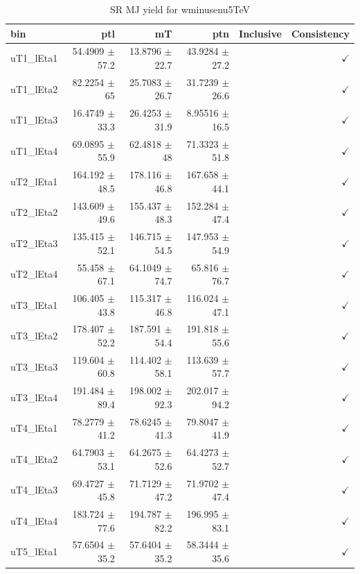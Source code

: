\begin{table}[htbp]
\centering
\scriptsize
\caption{SR MJ yield for wminusenu5TeV}
\label{tab:wminusenu5TeV}
\setlength{\tabcolsep}{6pt}
\begin{tabular}{lrrrrr}
\hline
bin & ptl & mT & ptn & Inclusive & Consistency \\
\hline
uT1\_lEta1 & 54.4909 $\pm$ 57.2 & 13.8796 $\pm$ 22.7 & 43.9284 $\pm$ 27.2 &  & $\checkmark$ \\
uT1\_lEta2 & 82.2254 $\pm$ 65 & 25.7083 $\pm$ 26.7 & 31.7239 $\pm$ 26.6 &  & $\checkmark$ \\
uT1\_lEta3 & 16.4749 $\pm$ 33.3 & 26.4253 $\pm$ 31.9 & 8.95516 $\pm$ 16.5 &  & $\checkmark$ \\
uT1\_lEta4 & 69.0895 $\pm$ 55.9 & 62.4818 $\pm$ 48 & 71.3323 $\pm$ 51.8 &  & $\checkmark$ \\
uT2\_lEta1 & 164.192 $\pm$ 48.5 & 178.116 $\pm$ 46.8 & 167.658 $\pm$ 44.1 &  & $\checkmark$ \\
uT2\_lEta2 & 143.609 $\pm$ 49.6 & 155.437 $\pm$ 48.3 & 152.284 $\pm$ 47.4 &  & $\checkmark$ \\
uT2\_lEta3 & 135.415 $\pm$ 52.1 & 146.715 $\pm$ 54.5 & 147.953 $\pm$ 54.9 &  & $\checkmark$ \\
uT2\_lEta4 & 55.458 $\pm$ 67.1 & 64.1049 $\pm$ 74.7 & 65.816 $\pm$ 76.7 &  & $\checkmark$ \\
uT3\_lEta1 & 106.405 $\pm$ 43.8 & 115.317 $\pm$ 46.8 & 116.024 $\pm$ 47.1 &  & $\checkmark$ \\
uT3\_lEta2 & 178.407 $\pm$ 52.2 & 187.591 $\pm$ 54.4 & 191.818 $\pm$ 55.6 &  & $\checkmark$ \\
uT3\_lEta3 & 119.604 $\pm$ 60.8 & 114.402 $\pm$ 58.1 & 113.639 $\pm$ 57.7 &  & $\checkmark$ \\
uT3\_lEta4 & 191.484 $\pm$ 89.4 & 198.002 $\pm$ 92.3 & 202.017 $\pm$ 94.2 &  & $\checkmark$ \\
uT4\_lEta1 & 78.2779 $\pm$ 41.2 & 78.6245 $\pm$ 41.3 & 79.8047 $\pm$ 41.9 &  & $\checkmark$ \\
uT4\_lEta2 & 64.7903 $\pm$ 53.1 & 64.2675 $\pm$ 52.6 & 64.4273 $\pm$ 52.7 &  & $\checkmark$ \\
uT4\_lEta3 & 69.4727 $\pm$ 45.8 & 71.7129 $\pm$ 47.2 & 71.9702 $\pm$ 47.4 &  & $\checkmark$ \\
uT4\_lEta4 & 183.724 $\pm$ 77.6 & 194.787 $\pm$ 82.2 & 196.995 $\pm$ 83.1 &  & $\checkmark$ \\
uT5\_lEta1 & 57.6504 $\pm$ 35.2 & 57.6404 $\pm$ 35.2 & 58.3444 $\pm$ 35.6 &  & $\checkmark$ \\

\end{tabular}
\end{table}
